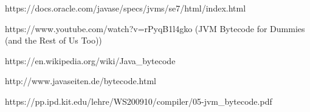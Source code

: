 https://docs.oracle.com/javase/specs/jvms/se7/html/index.html

https://www.youtube.com/watch?v=rPyqB1l4gko  (JVM Bytecode for Dummies (and the Rest of Us Too))

https://en.wikipedia.org/wiki/Java_bytecode

http://www.javaseiten.de/bytecode.html

https://pp.ipd.kit.edu/lehre/WS200910/compiler/05-jvm_bytecode.pdf
